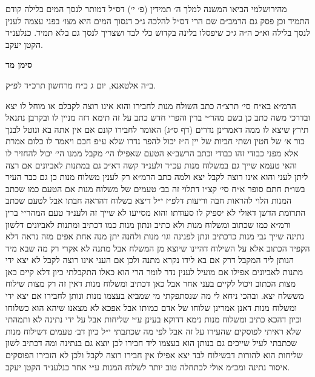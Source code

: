 \documentclass[12pt, openany]{book}
\newcommand{\chapname}{}
\newcommand{\newchap}[1]{
	\addcontentsline{toc}{chapter}{#1}
	\renewcommand{\chapname}{#1}
		\begin{center}
			\textbf{%
\fontsize{16pt}{16pt}\selectfont
				#1}
		\end{center}
}
\begin{document}
\begin{multicols}{2}
מהירושלמי הביאו המשנה למלך ה׳ תמידין (פ׳ י׳) דס״ל דמותר לנסך המים בלילה קודם התמיד וכן פסק גם הרמב״ם שם הרי דס״ל להלכה ג״כ דנסוך המים היא מצו׳ בפני עצמה לענין לנסך בלילה וא״כ ה״ה ג״כ שיפסלו בלינה בקדוש כלי לבד ושצריך לנסך גם בלא תמיד. כנלענ״ד הקטן יעקב.\\\vspace{0pt}

\end{multicols}\newpage

\newchap{סימן מד}
\begin{multicols}{2}
ב״ה אלטאנא, יום ג כ״ח מרחשון תרכ״ד לפ״ק.\\\vspace{0pt}

הרמ״א בא״ח סי׳ תרצ״ה כתב השולח מנות לחבירו והוא אינו רוצה לקבלם או מוחל לו יצא ובדרכי משה כתב כן בשם מהר״י ברין והפרי חדש כתב על זה תימא דזה מניין לו ובקרבן נתנאל תירץ שיצא לו ממה דאמרינן נדרים (דף ס״ג) האומר לחבירו קונם אם אין אתה בא ונוטל לבנך כור א׳ של חטין ושתי חביות של יין ה״ז יכול להפר נדרו שלא ע״פ חכם ויאמר לו כלום אמרת אלא מפני כבודי זהו כבודי וכתב הרשב״א הטעם שאפילו הי׳ מקבל ממנו הי׳ יכול להחזיר לו והאי טעמא שייך גם במשלוח מנות עכ״ד ולענ״ד קשה דא״כ גם במתנות לאביונים אם רצה ליתן לעני והוא אינו רוצה לקבל יצא ולמה כתב הרמ״א רק לענין משלוח מנות כן גם כבר העיר בשו״ת חתם סופר א״ח סי׳ קצ״ו דתלוי זה בב׳ טעמים של משלוח מנות אם הטעם כמו שכתב המנות הלוי להראות חבה וריעות דלפ״ז י״ל דיצא בשלוח דהראה חבתו אבל לטעם שכתב התרומת הדשן דאולי לא יספיק לו סעודתו והוא מסייעו לא שייך זה ולענ״ד טעם המהר״י ברין ורמ״א כמו שכתוב ומשלוח מנות ולא כתיב ונתון מנות כמו דכתיב ומתנות לאביונים דלשון נתינה שייך גבי מנות כדכתיב ונתן לפנינה וגו׳ מנות ולחנה יתן מנה אחת אפים מזה נראה דלא הקפיד הכתוב אלא על השילוח דהיינו שיוצא מן המשלח אבל מתנה לא אקרי רק מה שבא מיד הנותן ליד המקבל דרק אם בא לידו נקרא מתנה ולכן אם העני אינו רוצה לקבל לא יצא ידי מתנות לאביונים אפילו אם מועיל לענין נדר לומר הרי הוא כאלו התקבלתי כיון דלא קיים כאן מצות הכתוב ויכול לקיים בעני אחר אבל כאן דכתיב ומשלוח מנות דאין זה רק מצות שילוח מששלח יצא. ובהכי ניחא לי מה שנסתפקתי מי שמביא בעצמו מנות ונותן לחבירו אם יצא ידי ומשלוח מנות דאנן אמרינן שלוחו של אדם כמותו אבל אפכא לא מצאנו שיהא הוא כשלוחו וכיון דהכא כתיב ומשלוח מנות נימא דדוקא בעינן ע״י שליחות אבל על ידי נתינה לא ותמהתי שלא ראיתי לפוסקים שהעירו על זה אבל לפי מה שכתבתי י״ל כיון דב׳ טעמים דשילוח מנות שכתבתי לעיל שייכים גם בנותן הוא בעצמו ליד חבירו לכן יוצא גם בנתינה ומה דכתיב לשון שליחות הוא להורות דבשילוח לבד יצא אפילו אין חבירו רוצה לקבל ולכן לא הזכירו הפוסקים איסור נתינה ומכ״מ אולי לכתחלה טוב יותר לשלוח המנות ע״י אחר כנלענ״ד הקטן יעקב.\\\vspace{0pt}

\end{multicols}\newpage
\end{document}
